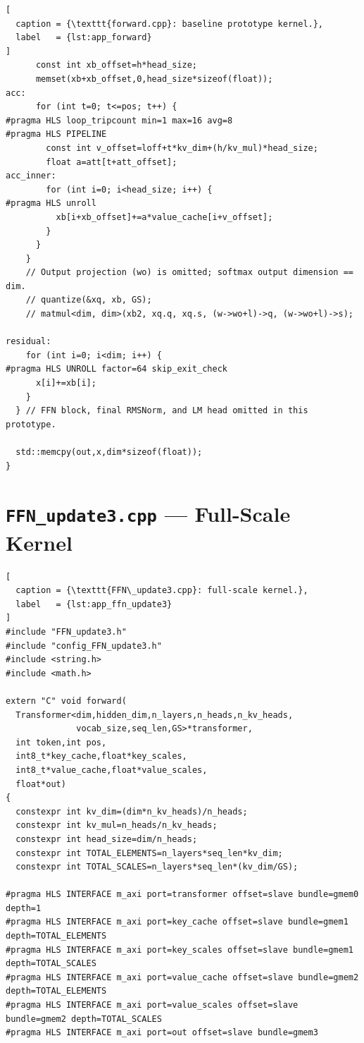 \begin{appendices}
\begin{lstlisting}[
  caption = {\texttt{forward.cpp}: baseline prototype kernel.},
  label   = {lst:app_forward}
]
      const int xb_offset=h*head_size;
      memset(xb+xb_offset,0,head_size*sizeof(float));
acc:
      for (int t=0; t<=pos; t++) {
#pragma HLS loop_tripcount min=1 max=16 avg=8
#pragma HLS PIPELINE
        const int v_offset=loff+t*kv_dim+(h/kv_mul)*head_size;
        float a=att[t+att_offset];
acc_inner:
        for (int i=0; i<head_size; i++) {
#pragma HLS unroll
          xb[i+xb_offset]+=a*value_cache[i+v_offset];
        }
      }
    }
    // Output projection (wo) is omitted; softmax output dimension == dim.
    // quantize(&xq, xb, GS);
    // matmul<dim, dim>(xb2, xq.q, xq.s, (w->wo+l)->q, (w->wo+l)->s);

residual:
    for (int i=0; i<dim; i++) {
#pragma HLS UNROLL factor=64 skip_exit_check
      x[i]+=xb[i];
    }
  } // FFN block, final RMSNorm, and LM head omitted in this prototype.

  std::memcpy(out,x,dim*sizeof(float));
}
\end{lstlisting}

\section{\texttt{FFN\_update3.cpp} --- Full-Scale Kernel}
\label{app:forward_update3}

\begin{lstlisting}[
  caption = {\texttt{FFN\_update3.cpp}: full-scale kernel.},
  label   = {lst:app_ffn_update3}
]
#include "FFN_update3.h"
#include "config_FFN_update3.h"
#include <string.h>
#include <math.h>

extern "C" void forward(
  Transformer<dim,hidden_dim,n_layers,n_heads,n_kv_heads,
              vocab_size,seq_len,GS>*transformer,
  int token,int pos,
  int8_t*key_cache,float*key_scales,
  int8_t*value_cache,float*value_scales,
  float*out)
{
  constexpr int kv_dim=(dim*n_kv_heads)/n_heads;
  constexpr int kv_mul=n_heads/n_kv_heads;
  constexpr int head_size=dim/n_heads;
  constexpr int TOTAL_ELEMENTS=n_layers*seq_len*kv_dim;
  constexpr int TOTAL_SCALES=n_layers*seq_len*(kv_dim/GS);

#pragma HLS INTERFACE m_axi port=transformer offset=slave bundle=gmem0 depth=1
#pragma HLS INTERFACE m_axi port=key_cache offset=slave bundle=gmem1 depth=TOTAL_ELEMENTS
#pragma HLS INTERFACE m_axi port=key_scales offset=slave bundle=gmem1 depth=TOTAL_SCALES
#pragma HLS INTERFACE m_axi port=value_cache offset=slave bundle=gmem2 depth=TOTAL_ELEMENTS
#pragma HLS INTERFACE m_axi port=value_scales offset=slave bundle=gmem2 depth=TOTAL_SCALES
#pragma HLS INTERFACE m_axi port=out offset=slave bundle=gmem3


\end{lstlisting}
\end{appendices}
